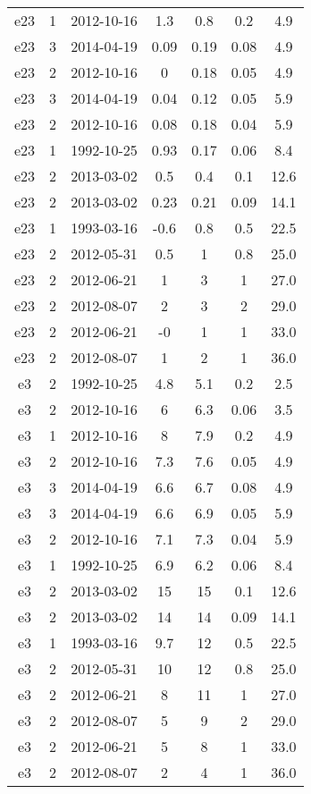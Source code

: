 \begin{table*}[htp]
\begin{tabular}{ccccccc}
e23 & 1 & 2012-10-16 & 1.3 & 0.8 & 0.2 & 4.9 \\
e23 & 3 & 2014-04-19 & 0.09 & 0.19 & 0.08 & 4.9 \\
e23 & 2 & 2012-10-16 & 0 & 0.18 & 0.05 & 4.9 \\
e23 & 3 & 2014-04-19 & 0.04 & 0.12 & 0.05 & 5.9 \\
e23 & 2 & 2012-10-16 & 0.08 & 0.18 & 0.04 & 5.9 \\
e23 & 1 & 1992-10-25 & 0.93 & 0.17 & 0.06 & 8.4 \\
e23 & 2 & 2013-03-02 & 0.5 & 0.4 & 0.1 & 12.6 \\
e23 & 2 & 2013-03-02 & 0.23 & 0.21 & 0.09 & 14.1 \\
e23 & 1 & 1993-03-16 & -0.6 & 0.8 & 0.5 & 22.5 \\
e23 & 2 & 2012-05-31 & 0.5 & 1 & 0.8 & 25.0 \\
e23 & 2 & 2012-06-21 & 1 & 3 & 1 & 27.0 \\
e23 & 2 & 2012-08-07 & 2 & 3 & 2 & 29.0 \\
e23 & 2 & 2012-06-21 & -0 & 1 & 1 & 33.0 \\
e23 & 2 & 2012-08-07 & 1 & 2 & 1 & 36.0 \\
e3 & 2 & 1992-10-25 & 4.8 & 5.1 & 0.2 & 2.5 \\
e3 & 2 & 2012-10-16 & 6 & 6.3 & 0.06 & 3.5 \\
e3 & 1 & 2012-10-16 & 8 & 7.9 & 0.2 & 4.9 \\
e3 & 2 & 2012-10-16 & 7.3 & 7.6 & 0.05 & 4.9 \\
e3 & 3 & 2014-04-19 & 6.6 & 6.7 & 0.08 & 4.9 \\
e3 & 3 & 2014-04-19 & 6.6 & 6.9 & 0.05 & 5.9 \\
e3 & 2 & 2012-10-16 & 7.1 & 7.3 & 0.04 & 5.9 \\
e3 & 1 & 1992-10-25 & 6.9 & 6.2 & 0.06 & 8.4 \\
e3 & 2 & 2013-03-02 & 15 & 15 & 0.1 & 12.6 \\
e3 & 2 & 2013-03-02 & 14 & 14 & 0.09 & 14.1 \\
e3 & 1 & 1993-03-16 & 9.7 & 12 & 0.5 & 22.5 \\
e3 & 2 & 2012-05-31 & 10 & 12 & 0.8 & 25.0 \\
e3 & 2 & 2012-06-21 & 8 & 11 & 1 & 27.0 \\
e3 & 2 & 2012-08-07 & 5 & 9 & 2 & 29.0 \\
e3 & 2 & 2012-06-21 & 5 & 8 & 1 & 33.0 \\
e3 & 2 & 2012-08-07 & 2 & 4 & 1 & 36.0 \\

\end{tabular}
\end{table*}
